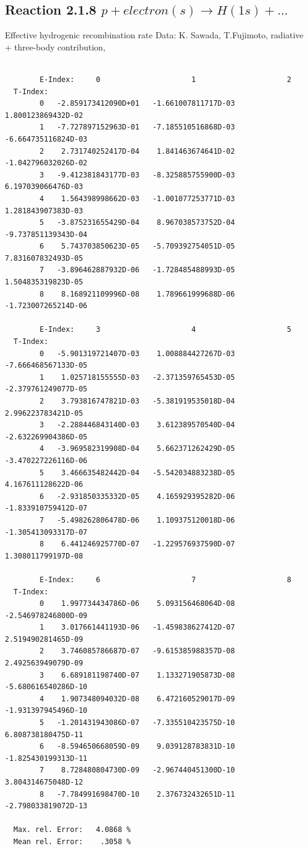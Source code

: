 \documentclass[12pt,dvips]{article}
\begin{document}
\subsection{
  Reaction 2.1.8 $ p + electron(s) \rightarrow H(1s) + ...$
}

   Effective hydrogenic recombination rate
   Data: K. Sawada, T.Fujimoto, radiative + three-body contribution, \cite{kn:Sawada}


\begin{small}\begin{verbatim}

        E-Index:     0                     1                     2
  T-Index:
        0   -2.859173412090D+01   -1.661007811717D-03    1.800123869432D-02
        1   -7.727897152963D-01   -7.185510516868D-03   -6.664735116824D-03
        2    2.731740252417D-04    1.841463674641D-02   -1.042796032026D-02
        3   -9.412381843177D-03   -8.325885755900D-03    6.197039066476D-03
        4    1.564398998662D-03   -1.001077253771D-03    1.281843907383D-03
        5   -3.875231655429D-04    8.967038573752D-04   -9.737851139343D-04
        6    5.743703850623D-05   -5.709392754051D-05    7.831607832493D-05
        7   -3.896462887932D-06   -1.728485488993D-05    1.504835319823D-05
        8    8.168921109996D-08    1.789661999688D-06   -1.723007265214D-06

        E-Index:     3                     4                     5
  T-Index:
        0   -5.901319721407D-03    1.008884427267D-03   -7.666468567133D-05
        1    1.025718155555D-03   -2.371359765453D-05   -2.379761249077D-05
        2    3.793816747821D-03   -5.381919535018D-04    2.996223783421D-05
        3   -2.288446843140D-03    3.612389570540D-04   -2.632269904386D-05
        4   -3.969582319908D-04    5.662371262429D-05   -3.470227226116D-06
        5    3.466635482442D-04   -5.542034883238D-05    4.167611128622D-06
        6   -2.931850335332D-05    4.165929395282D-06   -1.833910759412D-07
        7   -5.498262806478D-06    1.109375120018D-06   -1.305413093317D-07
        8    6.441246925770D-07   -1.229576937590D-07    1.308011799197D-08

        E-Index:     6                     7                     8
  T-Index:
        0    1.997734434786D-06    5.093156468064D-08   -2.546978246800D-09
        1    3.017661441193D-06   -1.459838627412D-07    2.519490281465D-09
        2    3.746085786687D-07   -9.615385988357D-08    2.492563949079D-09
        3    6.689181198740D-07    1.133271905873D-08   -5.680616540286D-10
        4    1.907348094032D-08    6.472160529017D-09   -1.931397945496D-10
        5   -1.201431943086D-07   -7.335510423575D-10    6.808738180475D-11
        6   -8.594650668059D-09    9.039128783831D-10   -1.825430199313D-11
        7    8.728480804730D-09   -2.967440451300D-10    3.804314675048D-12
        8   -7.784991698470D-10    2.376732432651D-11   -2.798033819072D-13

  Max. rel. Error:   4.0868 %
  Mean rel. Error:    .3058 %

\end{verbatim}\end{small}
\end{document}
